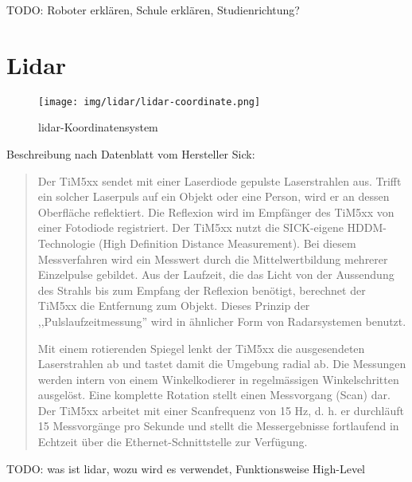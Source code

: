 TODO:
Roboter erklären, Schule erklären, Studienrichtung?

\section{Lidar}

\begin{figure}[H]
\centering
\texttt{[image: img/lidar/lidar-coordinate.png]}
\caption{\acrshort{lidar}-Koordinatensystem}
\label{fig:lidar}
\end{figure}

Beschreibung nach Datenblatt vom Hersteller Sick\cite{tim55x-techinfo}:
\begin{quote}
Der TiM5xx sendet mit einer Laserdiode gepulste Laserstrahlen aus. Trifft ein solcher Laserpuls auf ein Objekt oder eine Person, wird er an dessen Oberfläche reflektiert. Die Reflexion wird im Empfänger des TiM5xx von einer Fotodiode registriert. Der TiM5xx nutzt die SICK-eigene HDDM-Technologie (High Definition Distance Measurement). Bei diesem Messverfahren wird ein Messwert durch die Mittelwertbildung mehrerer Einzelpulse gebildet. Aus der Laufzeit, die das Licht von der Aussendung des Strahls bis zum Empfang der Reflexion benötigt, berechnet der TiM5xx die Entfernung zum Objekt. Dieses Prinzip der ,,Pulslaufzeitmessung'' wird in ähnlicher Form von Radarsystemen benutzt.

Mit einem rotierenden Spiegel lenkt der TiM5xx die ausgesendeten Laserstrahlen ab und tastet damit die Umgebung radial ab. Die Messungen werden intern von einem Winkelkodierer in regelmässigen Winkelschritten ausgelöst. Eine komplette Rotation stellt einen Messvorgang (Scan) dar. Der TiM5xx arbeitet mit einer Scanfrequenz von 15 Hz, d. h. er durchläuft 15 Messvorgänge pro Sekunde und stellt die Messergebnisse fortlaufend in Echtzeit über die Ethernet-Schnittstelle zur Verfügung.
\end{quote}

TODO:
was ist \acrshort{lidar}, wozu wird es verwendet, Funktionsweise High-Level





